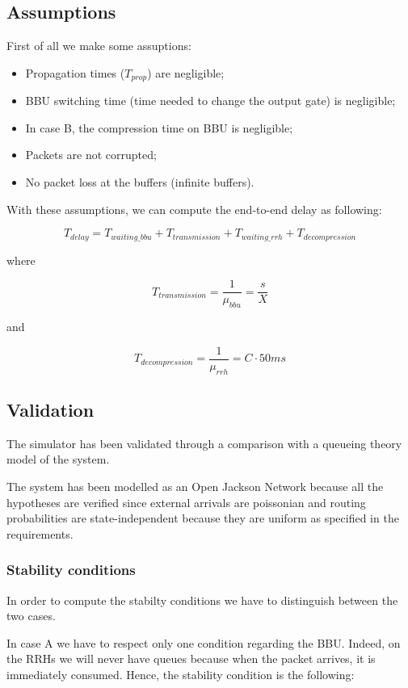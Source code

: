 \documentclass[11pt,a4paper,oneside, openright]{article}
\begin{document}
\subsection{Assumptions}
First of all we make some assuptions:
\begin{itemize}
    \item Propagation times ($ T_{prop} $) are negligible;
    \item BBU switching time (time needed to change the output gate) is negligible;
    \item In case B, the compression time on BBU is negligible;
    \item Packets are not corrupted;
    \item No packet loss at the buffers (infinite buffers).
\end{itemize}

With these assumptions, we can compute the end-to-end delay as following:

$$ T_{delay} =  T_{waiting\_bbu} + T_{transmission} + T_{waiting\_rrh} + T_{decompression} $$

where 

$$ T_{transmission} = \frac{1}{\mu_{bbu}} = \frac{s}{X} $$

and

$$ T_{decompression} = \frac{1}{\mu_{rrh}} = C \cdot 50ms $$

\subsection{Validation}
The simulator has been validated through a comparison with a queueing theory model of the system.

The system has been modelled as an Open Jackson Network because all the hypotheses are verified since external arrivals are poissonian and routing probabilities are state-independent because they are uniform as specified in the requirements.

\subsubsection{Stability conditions}
In order to compute the stabilty conditions we have to distinguish between the two cases.

In case A we have to respect only one condition regarding the BBU. Indeed, on the RRHs we will never have queues because when the packet arrives, it is immediately consumed.
Hence, the stability condition is the following:
\end{document}
